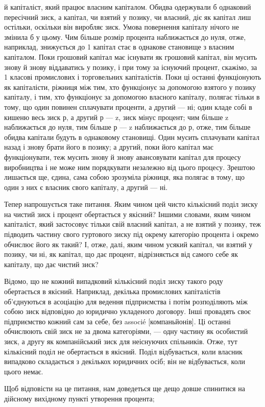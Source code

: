 й капіталіст, який працює власним капіталом. Обидва одержували
б однаковий пересічний зиск, а капітал, чи взятий у позику,
чи власний, діє як капітал лиш остільки, оскільки він
виробляє зиск. Умова повернення капіталу нічого не змінила б
у цьому. Чим більше розмір процента наближається до нуля,
отже, наприклад, знижується до 1%
капітал стає в однакове становище з власним капіталом.
Поки грошовий капітал має існувати як грошовий капітал,
він мусить знову й знову віддаватись у позику, і при тому
за існуючий процент, скажімо, за 1%
класові промислових і торговельних капіталістів. Поки ці останні
функціонують як капіталісти, ріжниця між тим, хто функціонує
за допомогою взятого у позику капіталу, і тим, хто функціонує за
допомогою власного капіталу, полягає тільки в тому, що один
повинен сплачувати проценти, а другий — ні; один кладе собі в
кишеню весь зиск р, а другий р — z, зиск мінус процент; чим
більше z наближається до нуля, тим більше р — z наближається
до р, отже, тим більше обидва капітали будуть в однаковому
становищі. Один мусить сплачувати капітал назад і знову брати
його в позику; а другий, поки його капітал має функціонувати,
теж мусить знову й знову авансовувати капітал для процесу
виробництва і не може ним порядкувати незалежно від цього
процесу. Зрештою лишається ще, єдина, сама собою зрозуміла
ріжниця, яка полягає в тому, що один з них є власник свого капіталу,
а другий — ні.

Тепер напрошується таке питання. Яким чином цей чисто
кількісний поділ зиску на чистий зиск і процент обертається
у якісний? Іншими словами, яким чином капіталіст, який застосовує
тільки свій власний капітал, а не взятий у позику, теж
підводить частину свого гуртового зиску під окрему категорію
процента і окремо обчислює його як такий? І, отже, далі, яким
чином усякий капітал, чи взятий у позику, чи ні, як капітал,
що дає процент, відрізняється від самого себе як капіталу, що
дає чистий зиск?

Відомо, що не кожний випадковий кількісний поділ зиску
такого роду обертається в якісний. Наприклад, декілька промислових
капіталістів об’єднуються в асоціацію для ведення підприємства
і потім розподіляють між собою зиск відповідно до
юридично укладеного договору. Інші провадять своє підприємство
кожний сам за себе, без associé [компаньйонів]. Ці останні
обчислюють свій зиск не за двома категоріями, — одну частину
як особистий зиск, а другу як компанійський зиск для неіснуючих
спільників. Отже, тут кількісний поділ не обертається
в якісний. Поділ відбувається, коли власник випадково складається
з декількох юридичних осіб; він не відбувається, коли
цього немає.

Щоб відповісти на це питання, нам доведеться ще дещо довше
спинитися на дійсному вихідному пункті утворення процента;
